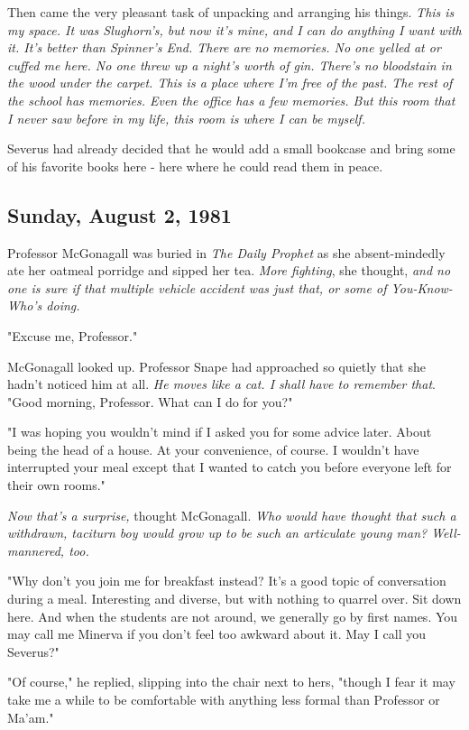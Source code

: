 Then came the very pleasant task of unpacking and arranging his things. \emph{This is my space. It was Slughorn's, but now it's mine, and I can do anything I want with it. It's better than Spinner's End. There are no memories. No one yelled at or cuffed me here. No one threw up a night's worth of gin. There's no bloodstain in the wood under the carpet. This is a place where I'm free of the past. The rest of the school has memories. Even the office has a few memories. But this room that I never saw before in my life, this room is where I can be myself.}

Severus had already decided that he would add a small bookcase and bring some of his favorite books here - here where he could read them in peace.

\subsection{Sunday, August 2, 1981}

Professor McGonagall was buried in \emph{The Daily Prophet} as she absent-mindedly ate her oatmeal porridge and sipped her tea. \emph{More fighting}, she thought, \emph{and no one is sure if that multiple vehicle accident was just that, or some of You-Know-Who's doing.}

"Excuse me, Professor."

McGonagall looked up. Professor Snape had approached so quietly that she hadn't noticed him at all. \emph{He moves like a cat. I shall have to remember that}. "Good morning, Professor. What can I do for you?"

"I was hoping you wouldn't mind if I asked you for some advice later. About being the head of a house. At your convenience, of course. I wouldn't have interrupted your meal except that I wanted to catch you before everyone left for their own rooms."

\emph{Now that's a surprise,} thought McGonagall. \emph{Who would have thought that such a withdrawn, taciturn boy would grow up to be such an articulate young man? Well-mannered, too.}

"Why don't you join me for breakfast instead? It's a good topic of conversation during a meal. Interesting and diverse, but with nothing to quarrel over. Sit down here. And when the students are not around, we generally go by first names. You may call me Minerva if you don't feel too awkward about it. May I call you Severus?"

"Of course," he replied, slipping into the chair next to hers, "though I fear it may take me a while to be comfortable with anything less formal than Professor or Ma'am."

